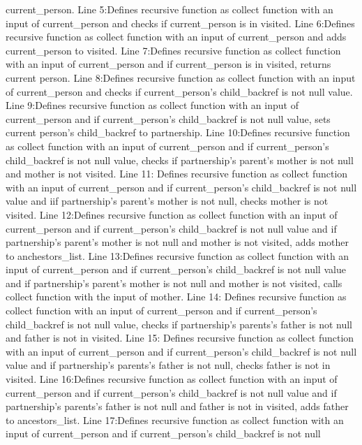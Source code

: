 \documentclass[
]{article}
\begin{document}
current\_person. Line 5:Defines recursive function as collect function with an input of
current\_person and checks if current\_person is in visited. Line 6:Defines recursive function as collect function with an input of
current\_person and adds current\_person to visited. Line 7:Defines recursive function as collect function with an input of
current\_person and if current\_person is in visited, returns current
person. Line 8:Defines recursive function as collect function with an input of
current\_person and checks if current\_person's child\_backref is not
null value. Line 9:Defines recursive function as collect function with an input of
current\_person and if current\_person's child\_backref is not null
value, sets current person's child\_backref to partnership. Line 10:Defines recursive function as collect function with an input of
current\_person and if current\_person's child\_backref is not null
value, checks if partnership's parent's mother is not null and mother is
not visited. Line 11: Defines recursive function as collect function with an input of
current\_person and if current\_person's child\_backref is not null
value and iif partnership's parent's mother is not null, checks mother
is not visited. Line 12:Defines recursive function as collect function with an input of
current\_person and if current\_person's child\_backref is not null
value and if partnership's parent's mother is not null and mother is not
visited, adds mother to anchestors\_list. Line 13:Defines recursive function as collect function with an input of
current\_person and if current\_person's child\_backref is not null
value and if partnership's parent's mother is not null and mother is not
visited, calls collect function with the input of mother. Line 14: Defines recursive function as collect function with an input of
current\_person and if current\_person's child\_backref is not null
value, checks if partnership's parents's father is not null and father
is not in visited. Line 15: Defines recursive function as collect function with an input of
current\_person and if current\_person's child\_backref is not null
value and if partnership's parents's father is not null, checks father
is not in visited. Line 16:Defines recursive function as collect function with an input of
current\_person and if current\_person's child\_backref is not null
value and if partnership's parents's father is not null and father is
not in visited, adds father to ancestors\_list. Line 17:Defines recursive function as collect function with an input of
current\_person and if current\_person's child\_backref is not null
\end{document}
